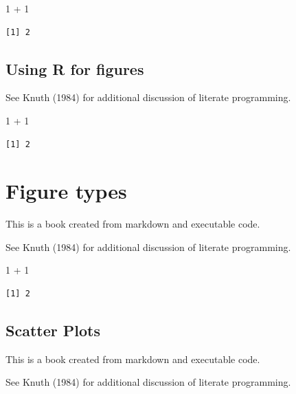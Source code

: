 \documentclass[
  letterpaper,
  DIV=11,
  numbers=noendperiod]{scrreprt}
\newenvironment{Shaded}{\begin{snugshade}}{\end{snugshade}}
\newcommand{\DecValTok}[1]{\textcolor[rgb]{0.68,0.00,0.00}{#1}}
\newcommand{\SpecialCharTok}[1]{\textcolor[rgb]{0.37,0.37,0.37}{#1}}
\begin{document}
\begin{Shaded}
\begin{Highlighting}[]
\DecValTok{1} \SpecialCharTok{+} \DecValTok{1}
\end{Highlighting}
\end{Shaded}

\begin{verbatim}
[1] 2
\end{verbatim}

\chapter{Using R for figures}\label{using-r-for-figures}

See Knuth (1984) for additional discussion of literate programming.

\begin{Shaded}
\begin{Highlighting}[]
\DecValTok{1} \SpecialCharTok{+} \DecValTok{1}
\end{Highlighting}
\end{Shaded}

\begin{verbatim}
[1] 2
\end{verbatim}

\part{Figure types}

This is a book created from markdown and executable code.

See Knuth (1984) for additional discussion of literate programming.

\begin{Shaded}
\begin{Highlighting}[]
\DecValTok{1} \SpecialCharTok{+} \DecValTok{1}
\end{Highlighting}
\end{Shaded}

\begin{verbatim}
[1] 2
\end{verbatim}

\chapter{Scatter Plots}\label{scatter-plots}

This is a book created from markdown and executable code.

See Knuth (1984) for additional discussion of literate programming.
\end{document}
